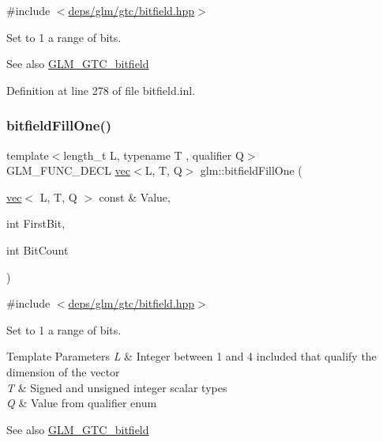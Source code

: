 {\ttfamily \#include $<$\hyperlink{bitfield_8hpp}{deps/glm/gtc/bitfield.\+hpp}$>$}

Set to 1 a range of bits.

\begin{DoxySeeAlso}{See also}
\hyperlink{group__gtc__bitfield}{G\+L\+M\+\_\+\+G\+T\+C\+\_\+bitfield} 
\end{DoxySeeAlso}


Definition at line 278 of file bitfield.\+inl.

\mbox{\label{group__gtc__bitfield_ga3e96dd1f0a4bc892f063251ed118c0c1}} 
\subsubsection{\texorpdfstring{bitfield\+Fill\+One()}{bitfieldFillOne()}\hspace{0.1cm}{\footnotesize\ttfamily [2/2]}}
{\footnotesize\ttfamily template$<$length\+\_\+t L, typename T , qualifier Q$>$ \\
G\+L\+M\+\_\+\+F\+U\+N\+C\+\_\+\+D\+E\+CL \hyperlink{structglm_1_1vec}{vec}$<$L, T, Q$>$ glm\+::bitfield\+Fill\+One (\begin{DoxyParamCaption}\item[{\hyperlink{structglm_1_1vec}{vec}$<$ L, T, Q $>$ const \&}]{Value,  }\item[{int}]{First\+Bit,  }\item[{int}]{Bit\+Count }\end{DoxyParamCaption})}



{\ttfamily \#include $<$\hyperlink{bitfield_8hpp}{deps/glm/gtc/bitfield.\+hpp}$>$}

Set to 1 a range of bits.


\begin{DoxyTemplParams}{Template Parameters}
{\em L} & Integer between 1 and 4 included that qualify the dimension of the vector \\
\hline
{\em T} & Signed and unsigned integer scalar types \\
\hline
{\em Q} & Value from qualifier enum\\
\hline
\end{DoxyTemplParams}
\begin{DoxySeeAlso}{See also}
\hyperlink{group__gtc__bitfield}{G\+L\+M\+\_\+\+G\+T\+C\+\_\+bitfield} 
\end{DoxySeeAlso}


